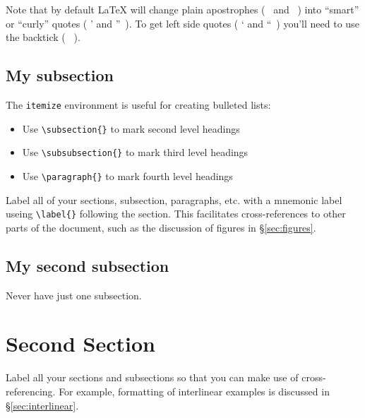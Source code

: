 
Note that by default {\LaTeX} will change plain apostrophes ( \textquotesingle\ and \textquotedbl\ ) into ``smart'' or ``curly'' quotes ( ' and ''\ ). To get left side quotes ( ` and ``\ ) you'll need to use the backtick ( \textasciigrave\ ).


\subsection{My subsection}\label{sec:first}
The \verb|itemize| environment is useful for creating bulleted lists:
\begin{itemize}
    \item Use \verb|\subsection{}| to mark second level headings
    \item Use \verb|\subsubsection{}| to mark third level headings
    \item Use \verb|\paragraph{}| to mark fourth level headings 
\end{itemize}

\noindent
Label all of your sections, subsection, paragraphs, etc. with a mnemonic label useing \verb|\label{}| following the section. This facilitates cross-references to other parts of the document, such as the discussion of figures in §\ref{sec:figures}.

\subsection{My second subsection}\label{sec:second}
Never have just one subsection.


\section{Second Section}
Label all your sections and subsections so that you can make use of cross-referencing. For example, formatting of interlinear examples is discussed in §\ref{sec:interlinear}.